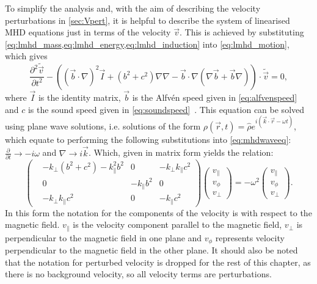 To simplify the analysis and, with the aim of describing the velocity perturbations in \cref{sec:Vpert}, it is helpful to describe the system of linearised MHD equations just in terms of the velocity $\vec{v}$.
This is achieved by substituting \cref{eq:lmhd_mass,eq:lmhd_energy,eq:lmhd_induction} into \cref{eq:lmhd_motion}, which gives
\begin{equation}
    \frac{\partial^2 \tilde{\vec{v}}}{\partial t^2} - \left( (\vec{b} \cdot \nabla)^2 \vec{I} + (b^2 + c^2) \nabla\nabla - \vec{b} \cdot \nabla (\nabla\vec{b} + \vec{b}\nabla) \right) \cdot \tilde{\vec{v}} = 0,\label{eq:mhdwaveeq}
\end{equation}
where $\vec{I}$ is the identity matrix, $\vec{b}$ is the Alfv\'en speed given in \cref{eq:alfvenspeed} and $c$ is the sound speed given in \cref{eq:soundspeed}~\citep{goedbloed2004}.
This equation can be solved using plane wave solutions, i.e. solutions of the form $\rho(\vec{r}, t) = \hat{\rho} e^{i(\vec{k}\cdot\vec{r} - \omega t)}$, which equate to performing the following substitutions into \cref{eq:mhdwaveeq}: $\frac{\partial}{\partial t} \rightarrow - i \omega$ and $\nabla \rightarrow i \vec{k}$.
Which, given in matrix form yields the relation:
\begin{equation}
\begin{pmatrix}
    &-k_\perp(b^2+c^2)-k_\parallel^2 b^2			& 0			& -k_\perp k_\parallel c^2\\
    & 0									&-k_\parallel b^2	& 0\\
    &-k_\perp k_\parallel c^2					& 0			& -k_\parallel c^2
\end{pmatrix}
\begin{pmatrix}
v_\parallel\\
v_\phi\\
v_\perp
\end{pmatrix}
= - \omega^2
\begin{pmatrix}
v_\parallel\\
v_\phi\\
v_\perp
\end{pmatrix}.\label{eq:eigenvalue}
\end{equation}
In this form the notation for the components of the velocity is with respect to the magnetic field. $v_\parallel$ is the velocity component parallel to the magnetic field, $v_\perp$ is perpendicular to the magnetic field in one plane and $v_\phi$ represents velocity perpendicular to the magnetic field in the other plane. It should also be noted that the notation for perturbed velocity is dropped for the rest of this chapter, as there is no background velocity, so all velocity terms are perturbations.

